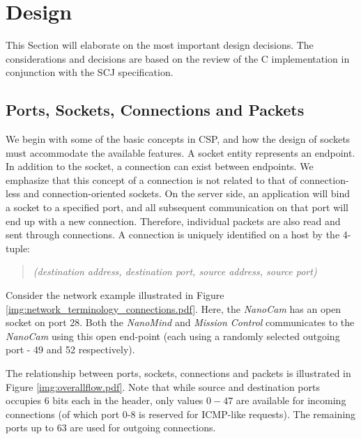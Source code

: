 \section{Design}
This Section will elaborate on the most important design decisions. The considerations and decisions are based on the review of the C implementation in conjunction with the SCJ specification.

\subsection{Ports, Sockets, Connections and Packets}
We begin with some of the basic concepts in CSP, and how the design of sockets must accommodate the available features. A socket entity represents an endpoint. In addition to the socket, a connection can exist between endpoints. We emphasize that this concept of a connection is not related to that of connection-less and connection-oriented sockets.  On the server side, an application will bind a socket to a specified port, and all subsequent communication on that port will end up with a new connection. Therefore, individual packets are also read and sent through connections. A connection is uniquely identified on a host by the 4-tuple:
\begin{quotation}
	\emph{(destination address, destination port, source address, source port)}
\end{quotation}

Consider the network example illustrated in Figure \ref{img:network_terminology_connections.pdf}. Here, the \textit{NanoCam} has an open socket on port 28. Both the \textit{NanoMind} and \textit{Mission Control} communicates to the \textit{NanoCam} using this open end-point (each using a randomly selected outgoing port - 49 and 52 respectively). 

The relationship between ports, sockets, connections and packets is illustrated in Figure \ref{img:overallflow.pdf}. Note that while source and destination ports occupies 6 bits each in the header, only values $0-47$ are available for incoming connections (of which port 0-8 is reserved for ICMP-like requests). The remaining ports up to 63 are used for outgoing connections.

